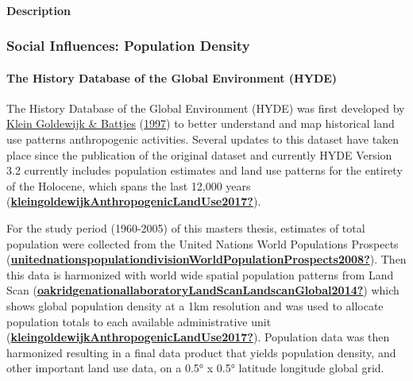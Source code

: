 \documentclass[12pt,twoside]{reedthesis}
\begin{document}
\hypertarget{description-2}{%
\paragraph{Description}\label{description-2}}

\hypertarget{social-influences-population-density}{%
\subsubsection{Social Influences: Population Density}\label{social-influences-population-density}}

\hypertarget{the-history-database-of-the-global-environment-hyde}{%
\paragraph{The History Database of the Global Environment (HYDE)}\label{the-history-database-of-the-global-environment-hyde}}

The History Database of the Global Environment (HYDE) was first developed by \protect\hyperlink{ref-kleingoldewijkHundredYear18901997}{Klein Goldewijk \& Battjes} (\protect\hyperlink{ref-kleingoldewijkHundredYear18901997}{1997}) to better understand and map historical land use patterns anthropogenic activities. Several updates to this dataset have taken place since the publication of the original dataset and currently HYDE Version 3.2 currently includes population estimates and land use patterns for the entirety of the Holocene, which spans the last 12,000 years (\protect\hyperlink{ref-kleingoldewijkAnthropogenicLandUse2017}{\textbf{kleingoldewijkAnthropogenicLandUse2017?}}).

For the study period (1960-2005) of this masters thesis, estimates of total population were collected from the United Nations World Populations Prospects (\protect\hyperlink{ref-unitednationspopulationdivisionWorldPopulationProspects2008}{\textbf{unitednationspopulationdivisionWorldPopulationProspects2008?}}). Then this data is harmonized with world wide spatial population patterns from Land Scan (\protect\hyperlink{ref-oakridgenationallaboratoryLandScanLandscanGlobal2014}{\textbf{oakridgenationallaboratoryLandScanLandscanGlobal2014?}}) which shows global population density at a 1km resolution and was used to allocate population totals to each available administrative unit (\protect\hyperlink{ref-kleingoldewijkAnthropogenicLandUse2017}{\textbf{kleingoldewijkAnthropogenicLandUse2017?}}). Population data was then harmonized resulting in a final data product that yields population density, and other important land use data, on a 0.5° x 0.5° latitude longitude global grid.
\end{document}
